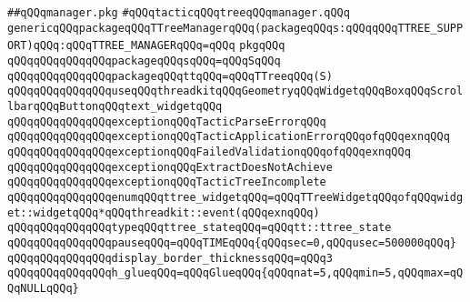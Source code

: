 \label{src/lib/x-kit/demo/tactic-tree/src/manager-g.pkg}
\verb|##qQQqmanager.pkg|\newline
\newline
\newline
\newline
\newline
\verb|#qQQqtacticqQQqtreeqQQqmanager.qQQq|\newline
\newline
\newline
\newline
\verb|genericqQQqpackageqQQqTTreeManagerqQQq(packageqQQqs:qQQqqQQqTTREE_SUPPORT)qQQq:qQQqTTREE_MANAGERqQQq=qQQq|\newline
\verb|pkgqQQq|\newline
\newline
\verb|qQQqqQQqqQQqqQQqpackageqQQqsqQQq=qQQqSqQQq|\newline
\verb|qQQqqQQqqQQqqQQqpackageqQQqttqQQq=qQQqTTreeqQQq(S)|\newline
\newline
\verb|qQQqqQQqqQQqqQQquseqQQqthreadkitqQQqGeometryqQQqWidgetqQQqBoxqQQqScrollbarqQQqButtonqQQqtext_widgetqQQq|\newline
\newline
\verb|qQQqqQQqqQQqqQQqexceptionqQQqTacticParseErrorqQQq|\newline
\verb|qQQqqQQqqQQqqQQqexceptionqQQqTacticApplicationErrorqQQqofqQQqexnqQQq|\newline
\verb|qQQqqQQqqQQqqQQqexceptionqQQqFailedValidationqQQqofqQQqexnqQQq|\newline
\verb|qQQqqQQqqQQqqQQqexceptionqQQqExtractDoesNotAchieve|\newline
\verb|qQQqqQQqqQQqqQQqexceptionqQQqTacticTreeIncomplete|\newline
\newline
\verb|qQQqqQQqqQQqqQQqenumqQQqttree_widgetqQQq=qQQqTTreeWidgetqQQqofqQQqwidget::widgetqQQq*qQQqthreadkit::event(qQQqexnqQQq)|\newline
\newline
\verb|qQQqqQQqqQQqqQQqtypeqQQqttree_stateqQQq=qQQqtt::ttree_state|\newline
\newline
\verb|qQQqqQQqqQQqqQQqpauseqQQq=qQQqTIMEqQQq{qQQqsec=0,qQQqusec=500000qQQq}|\newline
\verb|qQQqqQQqqQQqqQQqdisplay_border_thicknessqQQq=qQQq3|\newline
\newline
\verb|qQQqqQQqqQQqqQQqh_glueqQQq=qQQqGlueqQQq{qQQqnat=5,qQQqmin=5,qQQqmax=qQQqNULLqQQq}|\newline
